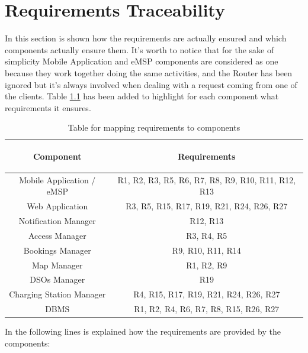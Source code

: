 \documentclass[a4paper]{report}
\begin{document}
\chapter{Requirements Traceability}
In this section is shown how the requirements are actually ensured and which components actually ensure them. It's worth to notice that for the sake of simplicity Mobile Application and eMSP components are considered as one because they work together doing the same activities, and the Router has been ignored  but it's always involved when dealing with a request coming from one of the clients.
Table \ref{tab:req-trace} has been added to highlight for each component what requirements it ensures.
\begin{table}[H]
  \centering
  \begin{tabular}{|c|c|}
    \cline{1-2}
   	\rule{0pt}{10pt}
   	\begin{large}
    \textbf{Component}
    \end{large}&\begin{large}
    \textbf{Requirements}
    \end{large}\\  \hline
    Mobile Application / eMSP &  R1, R2, R3, R5, R6, R7, R8, R9, R10, R11, R12, R13\\ \hline
    Web Application &  R3, R5, R15, R17, R19, R21, R24, R26, R27 \\ \hline
    Notification Manager &  R12, R13\\ \hline
    Access Manager & R3, R4, R5\\ \hline
    Bookings Manager & R9, R10, R11, R14\\ \hline
    Map Manager & R1, R2, R9 \\ \hline
    DSOs Manager &  R19\\ \hline
    Charging Station Manager & R4, R15, R17, R19, R21, R24, R26, R27 \\ \hline
    DBMS & R1, R2, R4, R6, R7, R8, R15, R26, R27 \\ \hline

  \end{tabular}
\caption{Table for mapping requirements to components} \label{tab:req-trace}
\end{table}
In the following lines is explained how the requirements are provided by the components:
\end{document}
